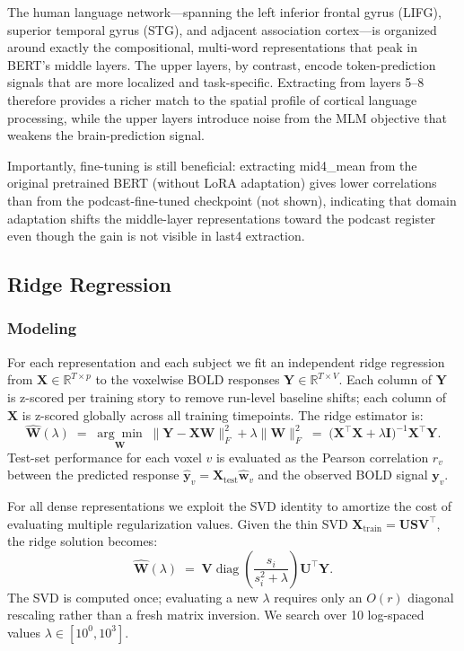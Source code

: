 The human language network---spanning the left inferior frontal gyrus (LIFG),
superior temporal gyrus (STG), and adjacent association cortex---is organized
around exactly the compositional, multi-word representations that peak in BERT's
middle layers.  The upper layers, by contrast, encode token-prediction signals
that are more localized and task-specific.  Extracting from layers 5--8 therefore
provides a richer match to the spatial profile of cortical language processing,
while the upper layers introduce noise from the MLM objective that weakens the
brain-prediction signal.

Importantly, fine-tuning is still beneficial: extracting mid4\_mean from the
original pretrained BERT (without LoRA adaptation) gives lower correlations than
from the podcast-fine-tuned checkpoint (not shown), indicating that domain
adaptation shifts the middle-layer representations toward the podcast register
even though the gain is not visible in last4 extraction.

\subsection{Ridge Regression}
\label{sec:ridge}

\subsubsection{Modeling}
For each representation and each subject we fit an independent ridge regression
from $\bm{X} \in \mathbb{R}^{T \times p}$ to the voxelwise BOLD responses
$\bm{Y} \in \mathbb{R}^{T \times V}$.  Each column of $\bm{Y}$ is z-scored
per training story to remove run-level baseline shifts; each column of $\bm{X}$
is z-scored globally across all training timepoints.  The ridge estimator is:
%
\begin{equation}
  \hat{\bm{W}}(\lambda) \;=\;
  \underset{\bm{W}}{\arg\min}\;
  \|\bm{Y} - \bm{X}\bm{W}\|_F^2 + \lambda\|\bm{W}\|_F^2
  \;=\;
  \bigl(\bm{X}^\top\bm{X} + \lambda\bm{I}\bigr)^{-1}\bm{X}^\top\bm{Y}.
\end{equation}
%
Test-set performance for each voxel $v$ is evaluated as the Pearson correlation
$r_v$ between the predicted response
$\hat{\bm{y}}_v = \bm{X}_{\mathrm{test}}\hat{\bm{w}}_v$
and the observed BOLD signal $\bm{y}_v$.


For all dense representations we exploit the SVD identity to amortize the cost
of evaluating multiple regularization values.  Given the thin SVD
$\bm{X}_{\mathrm{train}} = \bm{U}\bm{S}\bm{V}^\top$, the ridge solution becomes:
%
\begin{equation}
  \hat{\bm{W}}(\lambda) \;=\;
  \bm{V}\operatorname{diag}\!\left(\frac{s_i}{s_i^2 + \lambda}\right)\bm{U}^\top\bm{Y}.
\end{equation}
%
The SVD is computed once; evaluating a new $\lambda$ requires only an $O(r)$
diagonal rescaling rather than a fresh matrix inversion.  We search over 10
log-spaced values $\lambda \in [10^0, 10^3]$.

